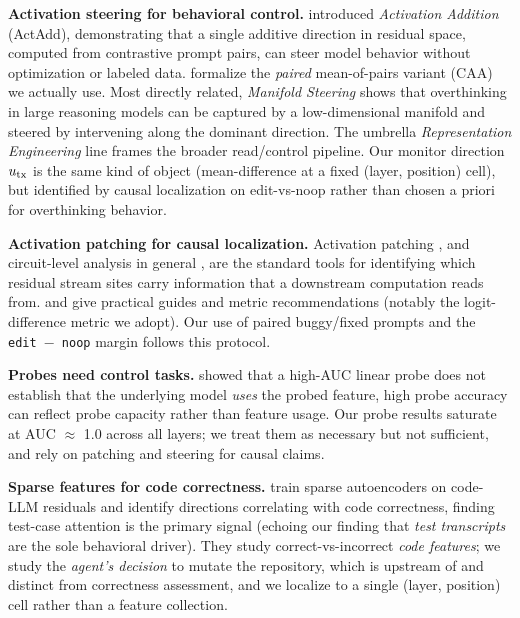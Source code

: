 \documentclass[
  11pt,
  a4paper]{article}
\begin{document}
\textbf{Activation steering for behavioral control.}
\citet{turner2023actadd} introduced \emph{Activation Addition} (ActAdd),
demonstrating that a single additive direction in residual space,
computed from contrastive prompt pairs, can steer model behavior without
optimization or labeled data. \citet{rimsky2024caa} formalize the
\emph{paired} mean-of-pairs variant (CAA) we actually use. Most directly
related, \emph{Manifold Steering} \citep{huang2025manifold} shows that
overthinking in large reasoning models can be captured by a
low-dimensional manifold and steered by intervening along the dominant
direction. The umbrella \emph{Representation Engineering}
\citep{zou2023representation} line frames the broader read/control
pipeline. Our monitor direction \(u_{\rm tx}\) is the same kind of
object (mean-difference at a fixed (layer, position) cell), but
identified by causal localization on edit-vs-noop rather than chosen a
priori for overthinking behavior.

\textbf{Activation patching for causal localization.} Activation
patching \citep{meng2022rome, wang2023ioi}, and circuit-level analysis
in general \citep{elhage2021mathematical}, are the standard tools for
identifying which residual stream sites carry information that a
downstream computation reads from. \citet{heimersheim2024patching} and
\citet{zhang2024patchingbestpractices} give practical guides and metric
recommendations (notably the logit-difference metric we adopt). Our use
of paired buggy/fixed prompts and the \texttt{edit\ \ensuremath{-}\ noop} margin
follows this protocol.

\textbf{Probes need control tasks.} \citet{hewitt2019probes} showed that
a high-AUC linear probe does not establish that the underlying model
\emph{uses} the probed feature, high probe accuracy can reflect probe
capacity rather than feature usage. Our probe results saturate at AUC \ensuremath{\approx}
1.0 across all layers; we treat them as necessary but not sufficient,
and rely on patching and steering for causal claims.

\textbf{Sparse features for code correctness.}
\citet{tahimic2025codecorrectness} train sparse autoencoders on code-LLM
residuals and identify directions correlating with code correctness,
finding test-case attention is the primary signal (echoing our finding
that \emph{test transcripts} are the sole behavioral driver). They study
correct-vs-incorrect \emph{code features}; we study the \emph{agent's
decision} to mutate the repository, which is upstream of and distinct
from correctness assessment, and we localize to a single (layer,
position) cell rather than a feature collection.
\end{document}
